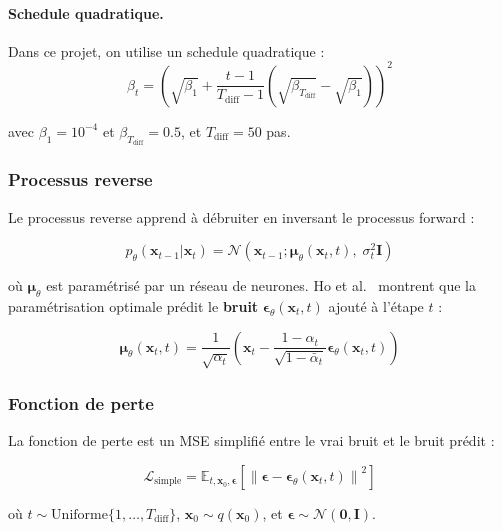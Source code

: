 \documentclass[12pt,a4paper]{article}
\newcommand{\E}{\mathbb{E}}
\newcommand{\N}{\mathcal{N}}
\newcommand{\bx}{\bm{x}}
\newcommand{\beps}{\bm{\epsilon}}
\begin{document}
\paragraph{Schedule quadratique.} Dans ce projet, on utilise un schedule quadratique :
\begin{equation}
\beta_t = \left(\sqrt{\beta_1} + \frac{t-1}{T_{\text{diff}}-1}\left(\sqrt{\beta_{T_{\text{diff}}}} - \sqrt{\beta_1}\right)\right)^2
\end{equation}

avec $\beta_1 = 10^{-4}$ et $\beta_{T_{\text{diff}}} = 0.5$, et $T_{\text{diff}} = 50$ pas.

\subsubsection{Processus reverse}

Le processus reverse apprend \`a d\'ebruiter en inversant le processus forward :

\begin{equation}
\boxed{p_\theta(\bx_{t-1} | \bx_t) = \N\left(\bx_{t-1} ; \bm{\mu}_\theta(\bx_t, t),\; \sigma_t^2 \bm{I}\right)}
\label{eq:reverse}
\end{equation}

o\`u $\bm{\mu}_\theta$ est param\'etris\'e par un r\'eseau de neurones. Ho et al.\ \cite{ho2020} montrent que la param\'etrisation optimale pr\'edit le \textbf{bruit} $\beps_\theta(\bx_t, t)$ ajout\'e \`a l'\'etape $t$ :

\begin{equation}
\bm{\mu}_\theta(\bx_t, t) = \frac{1}{\sqrt{\alpha_t}}\left(\bx_t - \frac{1-\alpha_t}{\sqrt{1-\bar{\alpha}_t}}\beps_\theta(\bx_t, t)\right)
\label{eq:mu_theta}
\end{equation}

\subsubsection{Fonction de perte}

La fonction de perte est un MSE simplifi\'e entre le vrai bruit et le bruit pr\'edit :

\begin{equation}
\boxed{\mathcal{L}_{\text{simple}} = \E_{t, \bx_0, \beps}\left[\left\|\beps - \beps_\theta(\bx_t, t)\right\|^2\right]}
\label{eq:loss_diffusion}
\end{equation}

o\`u $t \sim \text{Uniforme}\{1, \ldots, T_{\text{diff}}\}$, $\bx_0 \sim q(\bx_0)$, et $\beps \sim \N(\bm{0}, \bm{I})$.
\end{document}
